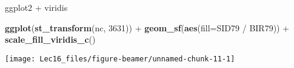 \documentclass[11pt,ignorenonframetext,]{beamer}
\newenvironment{Shaded}{}{}
\newcommand{\DataTypeTok}[1]{\textcolor[rgb]{0.56,0.13,0.00}{#1}}
\newcommand{\DecValTok}[1]{\textcolor[rgb]{0.25,0.63,0.44}{#1}}
\newcommand{\KeywordTok}[1]{\textcolor[rgb]{0.00,0.44,0.13}{\textbf{#1}}}
\newcommand{\NormalTok}[1]{#1}
\newcommand{\OperatorTok}[1]{\textcolor[rgb]{0.40,0.40,0.40}{#1}}
\newcommand{\StringTok}[1]{\textcolor[rgb]{0.25,0.44,0.63}{#1}}
\let\oldShaded\Shaded
\let\endoldShaded\endShaded
\renewenvironment{Shaded}{\footnotesize\begin{spacing}{0.9}\oldShaded}{\endoldShaded\end{spacing}}
\let\oldverbatim\verbatim
\let\endoldverbatim\endverbatim
\newcommand{\scriptoutput}{
  \renewenvironment{Shaded}{\scriptsize\begin{spacing}{0.9}\oldShaded}{\endoldShaded\end{spacing}}
  \renewenvironment{verbatim}{\scriptsize\begin{spacing}{0.9}\oldverbatim}{\endoldverbatim\end{spacing}}
}
\begin{document}
\begin{frame}[fragile,t]{ggplot2 + viridis}
\protect\hypertarget{ggplot2-viridis}{}

\scriptoutput

\begin{Shaded}
\begin{Highlighting}[]
\KeywordTok{ggplot}\NormalTok{(}\KeywordTok{st_transform}\NormalTok{(nc, }\DecValTok{3631}\NormalTok{)) }\OperatorTok{+}\StringTok{ }
\StringTok{  }\KeywordTok{geom_sf}\NormalTok{(}\KeywordTok{aes}\NormalTok{(}\DataTypeTok{fill=}\NormalTok{SID79 }\OperatorTok{/}\StringTok{ }\NormalTok{BIR79)) }\OperatorTok{+}
\StringTok{  }\KeywordTok{scale_fill_viridis_c}\NormalTok{()}
\end{Highlighting}
\end{Shaded}

\begin{center}\texttt{[image: Lec16\_files/figure-beamer/unnamed-chunk-11-1]} \end{center}

\end{frame}
\end{document}
